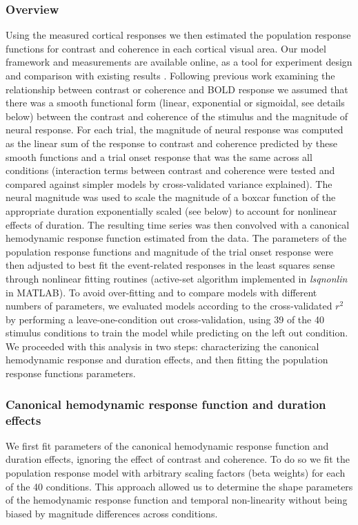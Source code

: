 \subsubsection{Overview}
Using the measured cortical responses we then estimated the population response functions for contrast and coherence in each cortical visual area. Our model framework and measurements are available online, as a tool for experiment design and comparison with existing results \citep{Birman2018-sp}. Following previous work examining the relationship between contrast or coherence and BOLD response \citep{Avidan2002-jg,Boynton1996-ff,Boynton1999-jd,Gardner2005-pg}
\citep{Heeger2000-pq,Logothetis2001-kk,Olman2004-dd,Rees2000-ul,Tootell1998-mr} we assumed that there was a smooth functional form (linear, exponential or sigmoidal, see details below) between the contrast and coherence of the stimulus and the magnitude of neural response. For each trial, the magnitude of neural response was computed as the linear sum of the response to contrast and coherence predicted by these smooth functions and a trial onset response that was the same across all conditions (interaction terms between contrast and coherence were tested and compared against simpler models by cross-validated variance explained). The neural magnitude was used to scale the magnitude of a boxcar function of the appropriate duration exponentially scaled (see below) to account for nonlinear effects of duration. The resulting time series was then convolved with a canonical hemodynamic response function estimated from the data. The parameters of the population response functions and magnitude of the trial onset response were then adjusted to best fit the event-related responses in the least squares sense through nonlinear fitting routines (active-set algorithm implemented in \textit{lsqnonlin} in MATLAB). To avoid over-fitting and to compare models with different numbers of parameters, we evaluated models according to the cross-validated $r^2$ by performing a leave-one-condition out cross-validation, using 39 of the 40 stimulus conditions to train the model while predicting on the left out condition. We proceeded with this analysis in two steps: characterizing the canonical hemodynamic response and duration effects, and then fitting the population response functions parameters.

\subsubsection{Canonical hemodynamic response function and duration effects}
We first fit parameters of the canonical hemodynamic response function and duration effects, ignoring the effect of contrast and coherence. To do so we fit the population response model with arbitrary scaling factors (beta weights) for each of the 40 conditions. This approach allowed us to determine the shape parameters of the hemodynamic response function and temporal non-linearity without being biased by magnitude differences across conditions.

